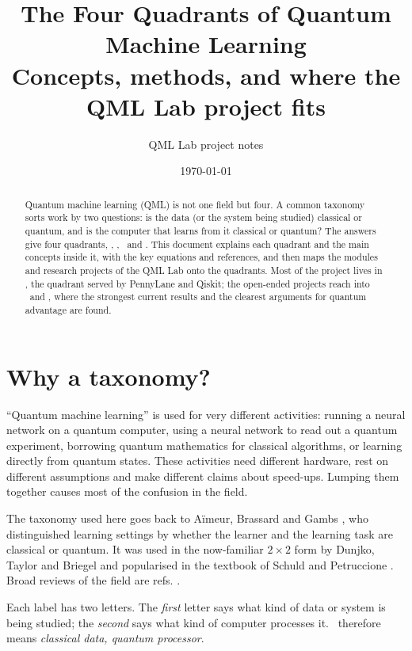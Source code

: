 \documentclass[11pt,a4paper]{article}
\title{\textbf{The Four Quadrants of Quantum Machine Learning}\\[0.4em]
  \large Concepts, methods, and where the QML Lab project fits}
\author{QML Lab project notes}
\date{\today}
\begin{document}
\maketitle

\begin{abstract}
\noindent
Quantum machine learning (QML) is not one field but four. A common taxonomy sorts work by two
questions: is the data (or the system being studied) classical or quantum, and is the computer that
learns from it classical or quantum? The answers give four quadrants, \CC, \CQ, \QC\ and \QQ. This
document explains each quadrant and the main concepts inside it, with the key equations and
references, and then maps the modules and research projects of the QML Lab onto the quadrants. Most
of the project lives in \CQ, the quadrant served by PennyLane and Qiskit; the open-ended projects
reach into \QC\ and \QQ, where the strongest current results and the clearest arguments for quantum
advantage are found.
\end{abstract}

\tableofcontents
\bigskip

\section{Why a taxonomy?}

``Quantum machine learning'' is used for very different activities: running a neural network on a
quantum computer, using a neural network to read out a quantum experiment, borrowing quantum
mathematics for classical algorithms, or learning directly from quantum states. These activities need
different hardware, rest on different assumptions and make different claims about speed-ups. Lumping
them together causes most of the confusion in the field.

The taxonomy used here goes back to A\"imeur, Brassard and Gambs \citeyearpar{aimeur2006}, who distinguished
learning settings by whether the learner and the learning task are classical or quantum. It was used
in the now-familiar $2\times2$ form by Dunjko, Taylor and Briegel \citeyearpar{dunjko2016,dunjko2018} and
popularised in the textbook of Schuld and Petruccione \citeyearpar{schuld2018,schuld2021book}. Broad reviews
of the field are refs. \citep{biamonte2017,dunjko2018,cerezo2021vqa}.

\begin{inshort}
Each label has two letters. The \emph{first} letter says what kind of data or system is being
studied; the \emph{second} says what kind of computer processes it. \CQ\ therefore means
\emph{classical data, quantum processor}.
\end{inshort}
\end{document}
